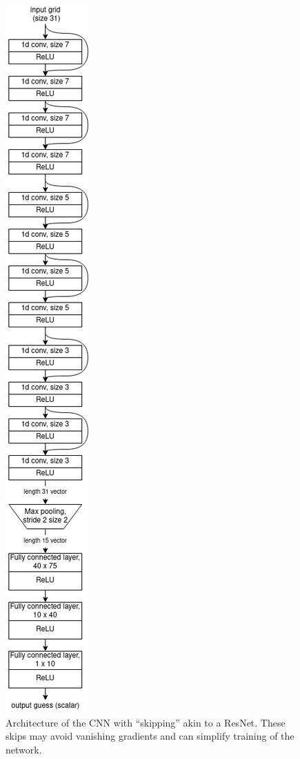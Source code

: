 \begin{figure}[t]
  \centering
  \includegraphics[scale=0.5]{figures/jacobi-conv/cnn_architecture.png}
  \caption{Architecture of the CNN with ``skipping'' akin to a ResNet.  These skips may avoid vanishing gradients and can simplify training of the network.}
  \label{fig:architecture}
\end{figure}

